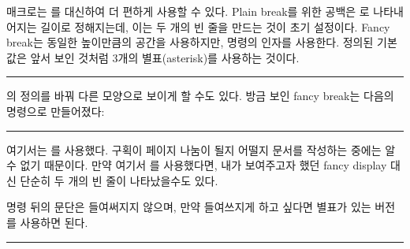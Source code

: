  \cmd{\pfbreak} 매크로는 \cmd{\plainfancybreak} 를 대신하여 더 편하게 사용할 수 있다.
 Plain break를 위한 공백은 \lnc{\pfbreakskip}로 나타내어지는 길이로 정해지는데,
 이는 두 개의 빈 줄을 만드는 것이 초기 설정이다.
 Fancy break는 동일한 높이만큼의 공간을 사용하지만,
\cmd{\pfbreakdisplay} 명령의   인자를 사용한다.
정의된 기본값은 앞서 보인 것처럼 3개의 별표(asterisk)를 사용하는 것이다.
\begin{lcode}
\newcommand*{\pfbreakdisplay}{*\quad*\quad*}
\end{lcode}


\renewcommand{\pfbreakdisplay}{%
 \ensuremath{\clubsuit\quad\diamondsuit\quad\clubsuit}}
\fancybreak{\pfbreakdisplay}

\cmd{\pfbreakdisplay}의 정의를 바꿔 다른 모양으로 보이게 할 수도 있다.
방금 보인 fancy break는 다음의 명령으로 만들어졌다:
\begin{lcode}
\renewcommand{\pfbreakdisplay}{%
  \ensuremath{\clubsuit\quad\diamondsuit\quad\clubsuit}}
\fancybreak{\pfbreakdisplay}
\end{lcode}
여기서는 \cmd{\fancybreak}를 사용했다.
구획이 페이지 나눔이 될지 어떨지 문서를 작성하는 중에는 알 수 없기 때문이다.
만약 여기서 \cmd{\pfbreak}를 사용했다면,
내가 보여주고자 했던 fancy display 대신 단순히 두 개의 빈 줄이 나타났을수도 있다.

\cmd{\pfbreak} 명령 뒤의 문단은 들여써지지 않으며, 만약 들여쓰지게 하고 싶다면
별표가 있는 버전 \cmd{\pfbreak*}를 사용하면 된다.

\renewcommand{\pfbreakdisplay}{\ding{167}\quad\ding{167}\quad\ding{167}}
\fancybreak{\pfbreakdisplay}

